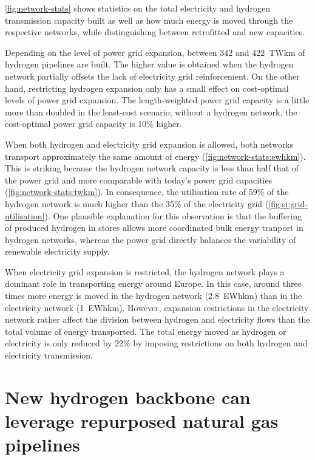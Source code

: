 \cref{fig:network-stats} shows statistics on the total electricity and hydrogen
transmission capacity built as well as how much energy is moved through the
respective networks, while distinguishing between retrofitted and new
capacities.

Depending on the level of power grid expansion, between 342 and 422~TWkm of
hydrogen pipelines are built. The higher value is obtained when the hydrogen
network partially offsets the lack of electricity grid reinforcement. On the
other hand, restricting hydrogen expansion only has a small effect on
cost-optimal levels of power grid expansion. The length-weighted power grid
capacity is a little more than doubled in the least-cost scenario; without a
hydrogen network, the cost-optimal power grid capacity is 10\%
higher.

When both hydrogen and electricity grid expansion is allowed, both networks
transport approximately the same amount of energy
(\cref{fig:network-stats:ewhkm}). This is striking because the hydrogen network
capacity is less than half that of the power grid and more comparable with
today's power grid capacities (\cref{fig:network-stats:twkm}). In consequence,
the utilisation rate of 59\% of the hydrogen network is much higher than the
35\% of the electricity grid (\cref{fig:si:grid-utilisation}). One plausible
explanation for this observation is that the buffering of produced hydrogen in
stores allows more coordinated bulk energy tranport in hydrogen networks,
whereas the power grid directly balances the variability of renewable
electricity supply.

When electricity grid expansion is restricted, the hydrogen network plays a
dominant role in transporting energy around Europe. In this case, around three
times more energy is moved in the hydrogen network (2.8~EWhkm) than in the
electricity network (1~EWhkm). However, expansion restrictions in the
electricity network rather affect the division between hydrogen and electricity
flows than the total volume of energy transported. The total energy moved as
hydrogen or electricity is only reduced by 22\% by imposing restrictions on both
hydrogen and electricity transmission.

\section*{New hydrogen backbone can leverage repurposed natural gas pipelines}
\label{sec:repurposed}

